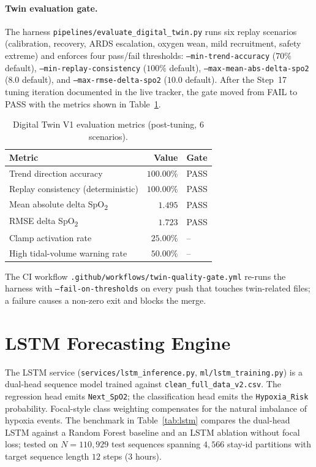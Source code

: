 \documentclass[12pt,a4paper,oneside]{report}
\begin{document}
\paragraph{Twin evaluation gate.} The harness \texttt{pipelines/evaluate\_digital\_twin.py} runs six replay scenarios (calibration, recovery, ARDS escalation, oxygen wean, mild recruitment, safety extreme) and enforces four pass/fail thresholds: \texttt{--min-trend-accuracy} ($70\%$ default), \texttt{--min-replay-consistency} ($100\%$ default), \texttt{--max-mean-abs-delta-spo2} ($8.0$ default), and \texttt{--max-rmse-delta-spo2} ($10.0$ default). After the Step~17 tuning iteration documented in the live tracker, the gate moved from FAIL to PASS with the metrics shown in Table~\ref{tab:twin}.

\begin{table}[h]
\centering
\caption{Digital Twin V1 evaluation metrics (post-tuning, $6$ scenarios).}
\label{tab:twin}
\begin{tabular}{lrl}
\toprule
\textbf{Metric} & \textbf{Value} & \textbf{Gate}\\
\midrule
Trend direction accuracy & $100.00\%$ & PASS\\
Replay consistency (deterministic) & $100.00\%$ & PASS\\
Mean absolute delta SpO\textsubscript{2} & $1.495$ & PASS\\
RMSE delta SpO\textsubscript{2} & $1.723$ & PASS\\
Clamp activation rate & $25.00\%$ & --\\
High tidal-volume warning rate & $50.00\%$ & --\\
\bottomrule
\end{tabular}
\end{table}

The CI workflow \texttt{.github/workflows/twin-quality-gate.yml} re-runs the harness with \texttt{--fail-on-thresholds} on every push that touches twin-related files; a failure causes a non-zero exit and blocks the merge.

\section{LSTM Forecasting Engine}
The LSTM service (\texttt{services/lstm\_inference.py}, \texttt{ml/lstm\_training.py}) is a dual-head sequence model trained against \texttt{clean\_full\_data\_v2.csv}. The regression head emits \texttt{Next\_SpO2}; the classification head emits the \texttt{Hypoxia\_Risk} probability. Focal-style class weighting compensates for the natural imbalance of hypoxia events. The benchmark in Table~\ref{tab:lstm} compares the dual-head LSTM against a Random Forest baseline and an LSTM ablation without focal loss; tested on $N = 110{,}929$ test sequences spanning $4{,}566$ stay-id partitions with target sequence length $12$ steps (3 hours).
\end{document}
